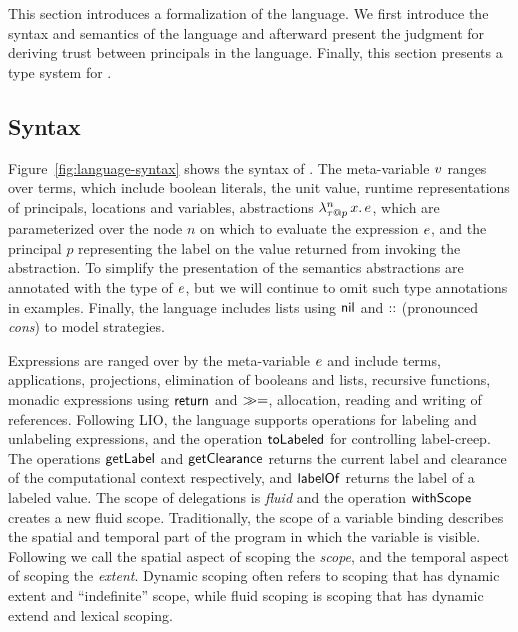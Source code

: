 This section introduces a formalization of the \lang{} language. We first introduce the syntax and semantics of the language and afterward present the judgment for deriving trust between principals in the language. Finally, this section presents a type system for \lang. 

\subsection{Syntax}
Figure~\ref{fig:language-syntax} shows the syntax of \lang. The meta-variable $v$ ranges over terms, which include boolean literals, the unit value, runtime representations of principals, locations and variables, abstractions $\lambda^{n}_{\tau \mathbin{@} p}\,x.\,e$, which are parameterized over the node $n$ on which to evaluate the expression $e$, and the principal $p$ representing the label on the value returned from invoking the abstraction. To simplify the presentation of the semantics abstractions are annotated with the type of $e$, but we will continue to omit such type annotations in examples. Finally, the language includes lists using $\mathsf{nil}$ and $\mathbin{::}$ (pronounced \emph{cons}) to model strategies.

Expressions are ranged over by the meta-variable $e$ and include terms, applications, projections, elimination of booleans and lists, recursive functions, monadic expressions using $\mathsf{return}$ and $\gg=$, allocation, reading and writing of references. Following LIO, the language supports operations for labeling and unlabeling expressions, and the operation $\mathsf{toLabeled}$ for controlling label-creep. The operations $\mathsf{getLabel}$ and $\mathsf{getClearance}$ returns the current label and clearance of the computational context respectively, and $\mathsf{labelOf}$ returns the label of a labeled value. The scope of delegations is \emph{fluid} \cite{Moore:2016:EAC:2983990.2984021} and the operation $\mathsf{withScope}$ creates a new fluid scope. Traditionally, the scope of a variable binding describes the spatial and temporal part of the program in which the variable is visible. Following \cite{Moore:2016:EAC:2983990.2984021} we call the spatial aspect of scoping the \emph{scope}, and the temporal aspect of scoping the \emph{extent}. Dynamic scoping often refers to scoping that has dynamic extent and ``indefinite'' scope, while fluid scoping is scoping that has dynamic extend and lexical scoping.

